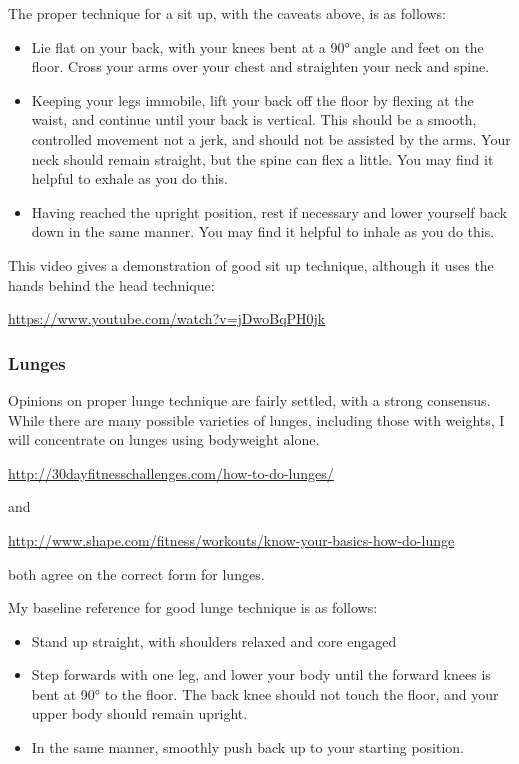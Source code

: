 \documentclass[a4paper]{article}
\begin{document}
The proper technique for a sit up, with the caveats above, is as follows:

\begin{itemize}
    \item Lie flat on your back, with your knees bent at a 90° angle and feet on the floor. Cross your arms over your chest and straighten your neck and spine.
    \item Keeping your legs immobile, lift your back off the floor by flexing at the waist, and continue until your back is vertical. This should be a smooth, controlled movement not a jerk, and should not be assisted by the arms. Your neck should remain straight, but the spine can flex a little. You may find it helpful to exhale as you do this.
    \item Having reached the upright position, rest if necessary and lower yourself back down in the same manner. You may find it helpful to inhale as you do this.
\end{itemize}

This video gives a demonstration of good sit up technique, although it uses the hands behind the head technique:

\url{https://www.youtube.com/watch?v=jDwoBqPH0jk}

\subsubsection{Lunges}

Opinions on proper lunge technique are fairly settled, with a strong consensus. While there are many possible varieties of lunges, including those with weights, I will concentrate on lunges using bodyweight alone.

\url{http://30dayfitnesschallenges.com/how-to-do-lunges/} 

and

\url{http://www.shape.com/fitness/workouts/know-your-basics-how-do-lunge}

both agree on the correct form for lunges. 

My baseline reference for good lunge technique is as follows:

\begin{itemize}
    \item Stand up straight, with shoulders relaxed and core engaged
    \item Step forwards with one leg, and lower your body until the forward knees is bent at 90° to the floor. The back knee should not touch the floor, and your upper body should remain upright.
    \item In the same manner, smoothly push back up to your starting position.
\end{itemize}
\end{document}
